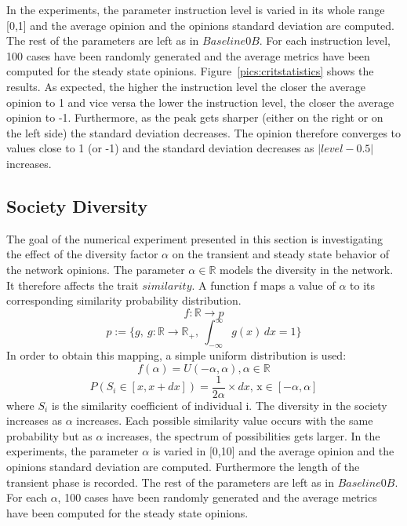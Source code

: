 In the experiments, the parameter instruction level is varied in its whole range [0,1] and the average opinion and the opinions standard deviation are computed. The rest of the parameters are left as in $Baseline0B$. For each instruction level, 100 cases have been randomly generated and the average metrics have been computed for the steady state opinions.
Figure~\ref{pics:critstatistics} shows the results. As expected, the higher the instruction level the closer the average opinion to 1 and vice versa the lower the instruction level, the closer the average opinion to -1. Furthermore, as the peak gets sharper (either on the right or on the left side) the standard deviation decreases. The opinion therefore converges to values close to 1 (or -1) and the standard deviation decreases as $|level-0.5|$ increases. 
\subsection{Society Diversity}
The goal of the numerical experiment presented in this section is investigating the effect of the diversity factor $\alpha$ on the transient and steady state behavior of the network opinions. The parameter $\alpha \in \mathbb{R}$ models the diversity in the network. It therefore affects the trait $similarity$.
A function f maps a value of $\alpha$ to its corresponding similarity probability distribution. 
$$
f: \mathbb{R} \to p 
$$
$$
p:= \{g,\ g: \mathbb{R} \to \mathbb{R}_+,\ \int_{-\infty}^{\infty} g(x) \,dx = 1\}
$$
In order to obtain this mapping, a simple uniform distribution is used:
$$
f(\alpha) = U(-\alpha, \alpha), \alpha \in \mathbb{R}
$$
$$
P(S_i\in[x,x+dx]) =  \frac{1}{2\alpha} \times dx\text{, x}\in [-\alpha, \alpha]
$$
where $S_i$ is the similarity coefficient of individual i.
The diversity in the society increases as $\alpha$ increases. Each possible similarity value occurs with the same probability but as $\alpha$ increases, the spectrum of possibilities gets larger. \newline
In the experiments, the parameter $\alpha$ is varied in [0,10] and the average opinion and the opinions standard deviation are computed. Furthermore the length of the transient phase is recorded. The rest of the parameters are left as in $Baseline0B$. For each $\alpha$, 100 cases have been randomly generated and the average metrics have been computed for the steady state opinions. 

